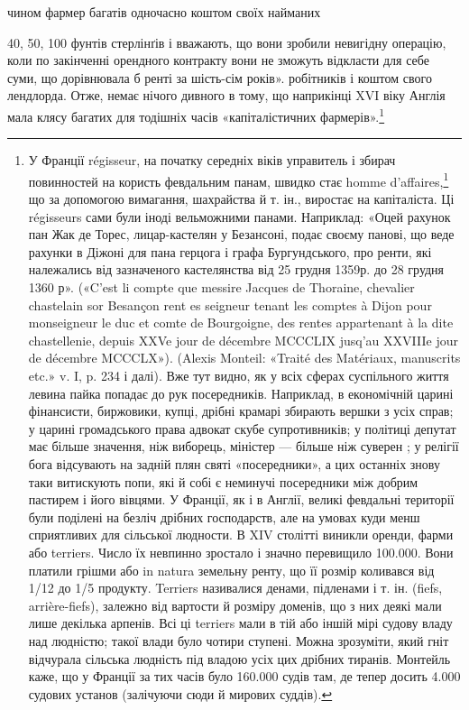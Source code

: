 чином фармер багатів одночасно коштом своїх найманих

40, 50, 100 фунтів стерлінґів і вважають, що вони зробили невигідну операцію,
коли по закінченні орендного контракту вони не зможуть відкласти
для себе суми, що дорівнювала б ренті за шість-сім років».
робітників і коштом свого лендлорда. Отже, немає нічого дивного
в тому, що наприкінці XVI віку Англія мала клясу багатих
для тодішніх часів «капіталістичних фармерів».\footnote{
У Франції régisseur, на початку середніх віків управитель і збирач
повинностей на користь февдальним панам, швидко стає homme
d’affaires,\footnote*{
— ділком. Ред.
} що за допомогою вимагання, шахрайства й т. ін., виростає
на капіталіста. Ці régisseurs сами були іноді вельможними панами. Наприклад:
«Оцей рахунок пан Жак де Торес, лицар-кастелян у
Безансоні, подає своєму панові, що веде рахунки в Діжоні для пана
герцога і графа Бургундського, про ренти, які належались від зазначеного
кастелянства від 25 грудня 1359р. до 28 грудня 1360 р». («C’est
li compte que messire Jacques de Thoraine, chevalier chastelain sor Besançon
rent es seigneur tenant les comptes à Dijon pour monseigneur le
duc et comte de Bourgoigne, des rentes appartenant à la dite chastellenie,
depuis XXVe jour de décembre MCCCLIX jusq’au XXVIIIe jour de décembre
MCCCLX»). (Alexis Monteil: «Traité des Matériaux, manuscrits etc.» v. I,
p. 234 і далі). Вже тут видно, як у всіх сферах суспільного життя левина
пайка попадає до рук посередників. Наприклад, в економічній царині фінансисти,
биржовики, купці, дрібні крамарі збирають вершки з усіх справ;
у царині громадського права адвокат скубе супротивників; у політиці
депутат має більше значення, ніж виборець, міністер — більше ніж суверен
; у релігії бога відсувають на задній плян святі «посередники», а цих
останніх знову таки витискують попи, які й собі є неминучі посередники
між добрим пастирем і його вівцями. У Франції, як і в Англії, великі
февдальні території були поділені на безліч дрібних господарств, але
на умовах куди менш сприятливих для сільської людности. В XIV столітті
виникли оренди, фарми або terriers. Число їх невпинно зростало і
значно перевищило 100.000. Вони платили грішми або in natura земельну
ренту, що її розмір коливався від 1/12 до 1/5 продукту. Terriers називалися
денами, підленами і т. ін. (fiefs, arrière-fiefs), залежно від вартости й
розміру доменів, що з них деякі мали лише декілька арпенів. Всі ці
terriers мали в тій або іншій мірі судову владу над людністю; такої влади
було чотири ступені. Можна зрозуміти, який гніт відчурала сільська
людність під владою усіх цих дрібних тиранів. Монтейль каже, що у Франції
за тих часів було 160.000 судів там, де тепер досить 4.000 судових установ
(залічуючи сюди й мирових суддів).
}

